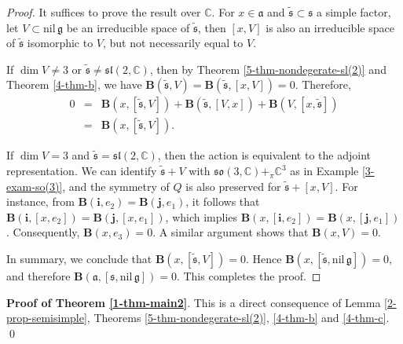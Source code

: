 \documentclass[reqno]{amsart}
\theoremstyle{definition}
\begin{document}
\begin{proof}
It suffices to prove the result over $\mathbb{C}$.
For $x\in \mathfrak{a}$ and $\tilde{\mathfrak{s}}\subset \mathfrak{s}$ a simple factor, let $V\subset \mathrm{nil}\,\mathfrak{g}$ be an irreducible space of $\tilde{\mathfrak{s}}$, then $[x,V]$ is also an
irreducible space of $\tilde{\mathfrak{s}}$ isomorphic to $V$, but not necessarily equal to $V$.


If $\dim V\neq 3$ or $\tilde{\mathfrak{s}}\neq\mathfrak{sl}(2,\mathbb{C})$, then by Theorem \ref{5-thm-nondegerate-sl(2)} and Theorem \ref{4-thm-b}, we have
$\mathbf{B}(\tilde{\mathfrak{s}}, V)=\mathbf{B}(\tilde{\mathfrak{s}}, [x,V])=0$. Therefore,
\begin{eqnarray*}
0 &=& \mathbf{B}(x,[\tilde{\mathfrak{s}},V])+\mathbf{B}(\tilde{\mathfrak{s}},[V,x])
+\mathbf{B}( V,[x,\tilde{\mathfrak{s}}])\\
  &=& \mathbf{B}(x,[\tilde{\mathfrak{s}},V]).
\end{eqnarray*}

If $\dim V=3$ and $\tilde{\mathfrak{s}}=\mathfrak{sl}(2,\mathbb{C})$, then the action  is equivalent to the adjoint representation. We can identify $\tilde{\mathfrak{s}}+V$ with $\mathfrak{so}(3,\mathbb{C})+_{\pi}\mathbb{C}^{3}$ as in Example \ref{3-exam-so(3)}, and   the symmetry of $Q$ is also preserved for $\tilde{\mathfrak{s}}+[x,V]$.
For instance, from $\mathbf{B}(\mathbf{i},e_{2})=\mathbf{B}(\mathbf{j},e_{1})$,
 it follows that $\mathbf{B}(\mathbf{i},[x,e_{2}])=\mathbf{B}(\mathbf{j},[x,e_{1}])$,
which implies
$\mathbf{B}(x,[\mathbf{i},e_{2}])=\mathbf{B}(x,[\mathbf{j},e_{1}])$.
Consequently,  $\mathbf{B}(x,e_{3})=0$. A similar argument shows that $\mathbf{B}(x,V)=0$.

In summary, we conclude that $\mathbf{B}(x,[\tilde{\mathfrak{s}},V])=0$.
Hence  $\mathbf{B}(x,[\tilde{\mathfrak{s}},\mathrm{nil}\,\mathfrak{g}])=0$, and therefore
$\mathbf{B}(\mathfrak{a},[\mathfrak{s},\mathrm{nil}\,\mathfrak{g}])=0$. This completes the proof.
\end{proof}

\textbf{Proof of Theorem \ref{1-thm-main2}}.
This is a direct consequence of Lemma \ref{2-prop-semisimple}, Theorems \ref{5-thm-nondegerate-sl(2)},
\ref{4-thm-b} and \ref{4-thm-c}.
\qed
\end{document}
